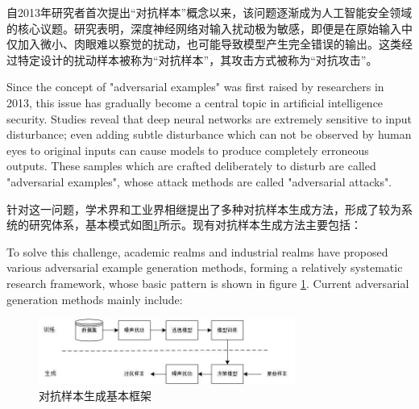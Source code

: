 自2013年研究者首次提出“对抗样本”概念以来\cite{goodfellow2014explaining}，该问题逐渐成为人工智能安全领域的核心议题。研究表明，深度神经网络对输入扰动极为敏感，即便是在原始输入中仅加入微小、肉眼难以察觉的扰动，也可能导致模型产生完全错误的输出。这类经过特定设计的扰动样本被称为“对抗样本”，其攻击方式被称为“对抗攻击”。

Since the concept of "adversarial examples" was first raised by researchers in 2013\cite{goodfellow2014explaining}, this issue has gradually become a central topic in artificial intelligence security. Studies reveal that deep neural networks are extremely sensitive to input disturbance; even adding subtle disturbance which can not be observed by human eyes to original inputs can cause models to produce completely erroneous outputs. These samples which are crafted deliberately to disturb are called "adversarial examples", whose attack methods are called "adversarial attacks".

针对这一问题，学术界和工业界相继提出了多种对抗样本生成方法，形成了较为系统的研究体系，基本模式如图\ref{fig:diagram}所示。现有对抗样本生成方法主要包括：

To solve this challenge, academic realms and industrial realms have proposed various adversarial example generation methods, forming a relatively systematic research framework, whose basic pattern is shown in figure \ref{fig:diagram}. Current adversarial generation methods mainly include:

\begin{figure}[hbt]
	\centering
	\includegraphics[width=0.75\textwidth]{figures/1.1}
	\caption{对抗样本生成基本框架}\label{fig:diagram}
\end{figure}

